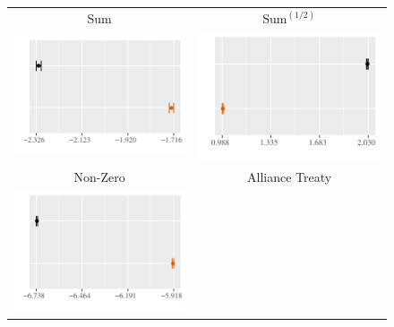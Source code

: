 \documentclass[reqno,onecolumn,letterpaper,12pt]{article}
\begin{document}
\begin{figure}[!p]
\centering
\begin{tabular}{c@{\hskip 0cm}c}
Sum & Sum$^{(1/2)}$ \\
\includegraphics[height=.2\textheight, clip=true, trim=0cm 0cm 0cm .2cm]{draft_figures/plots_pooled/Sum.pdf}    &
\includegraphics[height=.2\textheight, clip=true, trim=0cm 0cm 0cm .2cm]{draft_figures/plots_pooled/sum_5.pdf}   \\
Non-Zero & Alliance Treaty\\
\includegraphics[height=.2\textheight, clip=true, trim=0cm 0cm 0cm .2cm]{draft_figures/plots_pooled/Non-zero.pdf} &

\end{tabular}
\end{figure}
\end{document}
